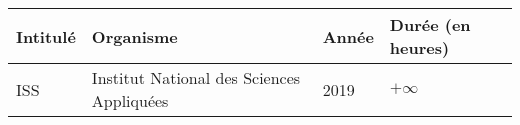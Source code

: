 \begin{center}
    \begin{tabular}{|L{1.75cm}|L{7.5cm}|C{1.5cm}|L{3.75cm}|}
        \hline %
        \textbf{Intitulé} & \textbf{Organisme} & \textbf{Année} & \textbf{Durée (en heures)} \\
        \hline %
        ISS & Institut National des Sciences Appliquées & 2019 & $+\infty$ \\
        \hline %
    \end{tabular}
\end{center}
